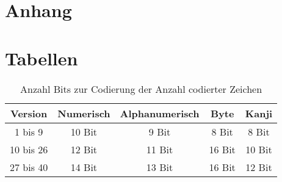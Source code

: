 \setcounter{page}{1}

\begin{appendix}
	\section*{Anhang}\label{chap:appendix}

	\section{Tabellen}

	\begin{table}[htbp]
		\centering
		\begin{tabular}{|c|c|c|c|c|}
			\hline
			\textbf{Version} & \textbf{Numerisch} & \textbf{Alphanumerisch} & \textbf{Byte} & \textbf{Kanji} \\ \hline
			1 bis 9          & 10 Bit             & 9 Bit                   & 8 Bit         & 8 Bit          \\ \hline
			10 bis 26        & 12 Bit             & 11 Bit                  & 16 Bit        & 10 Bit         \\ \hline
			27 bis 40        & 14 Bit             & 13 Bit                  & 16 Bit        & 12 Bit         \\ \hline
		\end{tabular}
		\caption[Anzahl Bits zur Codierung der Anzahl codierter Zeichen]{Anzahl Bits zur Codierung der Anzahl codierter Zeichen\footnotemark}
		\label{tab:encodenumberofcharacters}
	\end{table}


\end{appendix}
